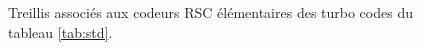 \begin{figure}[h!]
\begin{center}
		\caption{Treillis associés aux codeurs RSC élémentaires des turbo codes du tableau \ref{tab:std}.}
		\label{fig:treillisstd}
	\end{center}
\end{figure}

% 			
% 			
																																																																																																																																										
